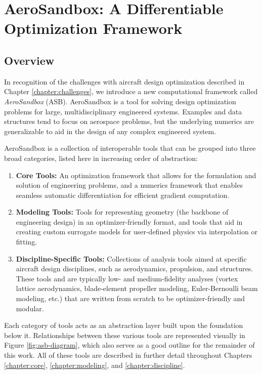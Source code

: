 \chapter{AeroSandbox: A Differentiable Optimization Framework}
\label{chapter:aerosandbox}


\section{Overview}

In recognition of the challenges with aircraft design optimization described in Chapter \ref{chapter:challenges}, we introduce a new computational framework called \textit{AeroSandbox} (ASB). AeroSandbox is a tool for solving design optimization problems for large, multidisciplinary engineered systems. Examples and data structures tend to focus on aerospace problems, but the underlying numerics are generalizable to aid in the design of any complex engineered system.

AeroSandbox is a collection of interoperable tools that can be grouped into three broad categories, listed here in increasing order of abstraction:

\begin{enumerate}
    \item \textbf{Core Tools:} An optimization framework that allows for the formulation and solution of engineering problems, and a numerics framework that enables seamless automatic differentiation for efficient gradient computation.

    \item \textbf{Modeling Tools:} Tools for representing geometry (the backbone of engineering design) in an optimizer-friendly format, and tools that aid in creating custom surrogate models for user-defined physics via interpolation or fitting.

    \item \textbf{Discipline-Specific Tools:} Collections of analysis tools aimed at specific aircraft design disciplines, such as aerodynamics, propulsion, and structures. These tools and are typically low- and medium-fidelity analyses (vortex lattice aerodynamics, blade-element propeller modeling, Euler-Bernoulli beam modeling, etc.) that are written from scratch to be optimizer-friendly and modular.

\end{enumerate}

Each category of tools acts as an abstraction layer built upon the foundation below it. Relationships between these various tools are represented visually in Figure \ref{fig:asb-diagram}, which also serves as a good outline for the remainder of this work. All of these tools are described in further detail throughout Chapters \ref{chapter:core}, \ref{chapter:modeling}, and \ref{chapter:discipline}.

